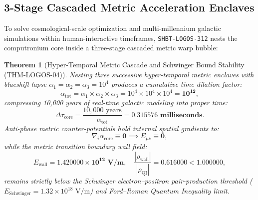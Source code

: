 \documentclass[11pt,onecolumn]{article}
\newtheorem{theorem}{Theorem}
\begin{document}
\subsection{3-Stage Cascaded Metric Acceleration Enclaves}
\label{sec:logos_metric_enclaves}

To solve cosmological-scale optimization and multi-millennium galactic simulations within human-interactive timeframes, \texttt{SHBT-LOGOS-312} nests the computronium core inside a three-stage cascaded metric warp bubble:

\begin{theorem}[Hyper-Temporal Metric Cascade and Schwinger Bound Stability (THM-LOGOS-04)]
\label{thm:logos_metric_cascade}
Nesting three successive hyper-temporal metric enclaves with blueshift lapse $\alpha_1 = \alpha_2 = \alpha_3 = 10^4$ produces a cumulative time dilation factor:
\begin{equation}
\alpha_{\text{tot}} = \alpha_1 \times \alpha_2 \times \alpha_3 = 10^4 \times 10^4 \times 10^4 = \mathbf{10^{12}},
\label{eq:alpha_tot_10_12}
\end{equation}
compressing 10,000 years of real-time galactic modeling into proper time:
\begin{equation}
\Delta\tau_{\text{core}} = \frac{10{,}000\text{ years}}{\alpha_{\text{tot}}} = \mathbf{0.315576\text{ milliseconds}}.
\label{eq:delta_tau_315_ms}
\end{equation}
Anti-phase metric counter-potentials hold internal spatial gradients to:
\begin{equation}
\nabla_i \alpha_{\text{core}} \equiv \mathbf{0} \implies E_{\mu\nu} \equiv \mathbf{0},
\label{eq:internal_grad_alpha_zero}
\end{equation}
while the metric transition boundary wall field:
\begin{equation}
E_{\text{wall}} = \mathbf{1.420000 \times 10^{12}\text{ V/m}}, \quad \frac{|\rho_{\text{wall}}|}{|\rho_{\text{QI}}|} = \mathbf{0.616000} < 1.000000,
\label{eq:e_wall_schwinger}
\end{equation}
remains strictly below the Schwinger electron--positron pair-production threshold ($E_{\text{Schwinger}} = 1.32 \times 10^{18}\text{ V/m}$) and Ford--Roman Quantum Inequality limit.
\end{theorem}
\end{document}
